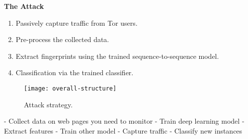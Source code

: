 \noindent
\textbf{The Attack}
\begin{enumerate}[resume]
  \item Passively capture traffic from Tor users.
  \item Pre-process the collected data.
  \item Extract fingerprints using the trained sequence-to-sequence model.
  \item Classification via the trained classifier.
\end{enumerate}

\begin{figure}[ht]
  \centering
  \texttt{[image: overall-structure]}
  \caption{Attack strategy.}
  \label{fig:attack-strategy}
\end{figure}



- Collect data on web pages you need to monitor
- Train deep learning model
- Extract features
- Train other model
- Capture traffic
- Classify new instances




